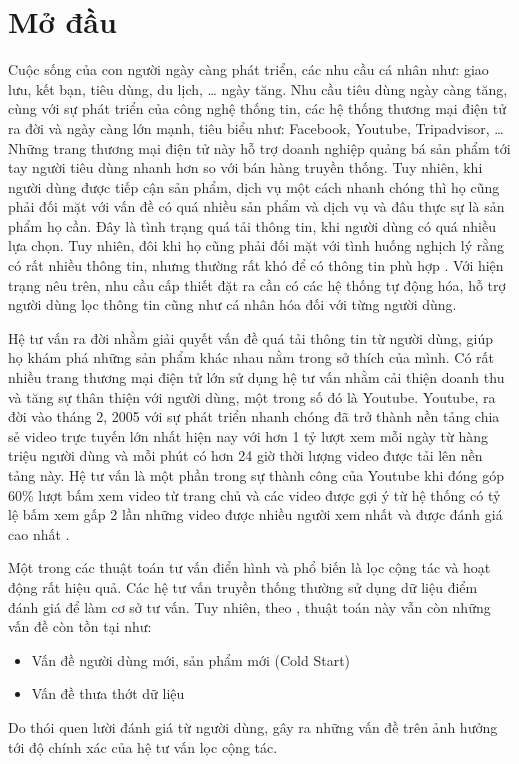 \chapter*{\centering\Large{Mở đầu}}

Cuộc sống của con người ngày càng phát triển, các nhu cầu cá nhân như: giao lưu,
kết bạn, tiêu dùng, du lịch, … ngày tăng. Nhu cầu tiêu dùng ngày càng tăng, cùng với
sự phát triển của công nghệ thống tin, các hệ thống thương mại điện tử ra đời và ngày
càng lớn mạnh, tiêu biểu như: Facebook, Youtube, Tripadvisor, … Những trang thương
mại điện tử này hỗ trợ doanh nghiệp quảng bá sản phẩm tới tay người tiêu dùng nhanh
hơn so với bán hàng truyền thống. Tuy nhiên, khi người dùng được tiếp cận sản phẩm,
dịch vụ một cách nhanh chóng thì họ cũng phải đối mặt với vấn đề có quá nhiều sản
phẩm và dịch vụ và đâu thực sự là sản phẩm họ cần. Đây là tình trạng quá tải thông tin,
khi người dùng có quá nhiều lựa chọn. Tuy nhiên, đôi khi họ cũng phải đối mặt với tình
huống nghịch lý rằng có rất nhiều thông tin, nhưng thường rất khó để có thông tin phù
hợp \cite{edmunds2000problem}. Với hiện trạng nêu trên, nhu cầu cấp thiết đặt ra cần có các hệ thống tự động
hóa, hỗ trợ người dùng lọc thông tin cũng như cá nhân hóa đối với từng người dùng.

Hệ tư vấn ra đời nhằm giải quyết vấn đề quá tải thông tin từ người dùng, giúp họ
khám phá những sản phẩm khác nhau nằm trong sở thích của mình. Có rất nhiều trang
thương mại điện tử lớn sử dụng hệ tư vấn nhằm cải thiện doanh thu và tăng sự thân thiện
với người dùng, một trong số đó là Youtube. Youtube, ra đời vào tháng 2, 2005 với sự
phát triển nhanh chóng đã trở thành nền tảng chia sẻ video trực tuyến lớn nhất hiện nay
với hơn 1 tỷ lượt xem mỗi ngày từ hàng triệu người dùng và mỗi phút có hơn 24 giờ
thời lượng video được tải lên nền tảng này. Hệ tư vấn là một phần trong sự thành công
của Youtube khi đóng góp 60\% lượt bấm xem video từ trang chủ và các video được gợi
ý từ hệ thống có tỷ lệ bấm xem gấp 2 lần những video được nhiều người xem nhất và
được đánh giá cao nhất \cite{davidson2010youtube}.

Một trong các thuật toán tư vấn điển hình và phổ biến là lọc cộng tác và hoạt động
rất hiệu quả. Các hệ tư vấn truyền thống thường sử dụng dữ liệu điểm đánh giá để làm
cơ sở tư vấn. Tuy nhiên, theo \cite{isinkaye2015recommendation}, thuật toán này vẫn còn những vấn đề còn tồn tại như:
\begin{itemize}
    \item Vấn đề người dùng mới, sản phẩm mới (Cold Start)
    \item Vấn đề thưa thớt dữ liệu
\end{itemize}
Do thói quen lười đánh giá từ người dùng, gây ra những vấn đề trên ảnh hưởng tới độ
chính xác của hệ tư vấn lọc cộng tác.

